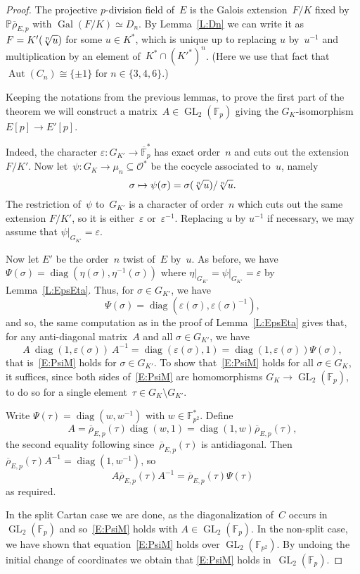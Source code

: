 \documentclass[twoside,leqno,symbols-for-thanks, draft]{rmi}
\numberwithin{equation}{section}
\newcommand{\F}{\mathbb{F}}
\newcommand{\Fp}{\mathbb{F}_p}
\newcommand{\PP}{\mathbb{P}}
\newcommand{\rhobar}{{\overline{\rho}}}
\newcommand{\eps}{\varepsilon}
\newcommand{\calO}{\mathcal{O}}
\DeclareMathOperator{\Aut}{Aut}
\DeclareMathOperator{\Gal}{Gal}
\newcommand{\GL}{\operatorname{GL}}
\newcommand{\diag}{{\operatorname{diag}}}
\theoremstyle{remark}
\begin{document}
\begin{proof} 
The projective $p$-division field of~$E$ is the Galois extension~$F/K$
fixed by $\PP \rhobar_{E,p}$ with $\Gal(F/K) \simeq D_n$. By
Lemma~\ref{L:Dn} we can write it as $F=K'(\root n\of u)$ for some
$u\in K^*$, which is unique up to replacing $u$ by~$u^{-1}$ and
multiplication by an element of~$K^*\cap(K'^*)^n$.  (Here we use that
fact that~$\Aut(C_n)\cong\{\pm1\}$ for $n\in\{3,4,6\}$.)

Keeping the notations from the previous lemmas, to prove the first
part of the theorem we will construct a matrix~$A\in\GL_2(\Fp)$
giving the $G_K$-isomorphism $E[p]\to E'[p]$.

Indeed, the character $\eps:G_{K'} \to
\overline{\F}_p^*$ has exact order~$n$ and cuts out the extension
$F/K'$.
Now let~$\psi:G_K\to \mu_n\subseteq\calO^*$ be the cocycle associated
to~$u$, namely
\[
\sigma\mapsto \psi(\sigma) = \sigma(\root n\of u)/\root n\of u.
\]
The restriction of~$\psi$ to~$G_{K'}$ is a character of order~$n$
which cuts out the same extension $F/K'$, so it is either~$\eps$ or~$\eps^{-1}$.  Replacing $u$ by $u^{-1}$ if necessary, we may assume that
$\left.\psi\right|_{G_{K'}} = \eps$.

Now let $E'$ be the order~$n$ twist of~$E$ by~$u$.  As before, we have
$\Psi(\sigma)=\diag(\eta(\sigma),\eta^{-1}(\sigma))$ where
$\left.\eta\right|_{G_{K'}} = \left.\psi\right|_{G_{K'}} = \eps$ by Lemma~\ref{L:EpsEta}.
Thus, for $\sigma\in G_{K'}$, we have
\[
\Psi(\sigma) = \diag(\eps(\sigma),\eps(\sigma)^{-1}),
\]
and so, the same computation as in the proof of Lemma~\ref{L:EpsEta} 
gives that, for any anti-diagonal matrix~$A$
and all $\sigma\in G_{K'}$, we have
\[
A\ \diag(1,\eps(\sigma))\ A^{-1} = \diag(\eps(\sigma),1) =
\diag(1,\eps(\sigma)) \Psi(\sigma),
\]
that is~\eqref{E:PsiM} holds for $\sigma\in G_{K'}$.  To show
that~\eqref{E:PsiM} holds for all $\sigma\in G_{K}$, it suffices,
since both sides of~\eqref{E:PsiM} are homomorphisms $G_K\to
\GL_2(\Fp)$, to do so for a single element~$\tau\in G_K\setminus
G_{K'}$.

Write $\Psi(\tau)=\diag(w,w^{-1})$ with $w\in\F_{p^2}^*$.  Define
\[
A=\rhobar_{E,p}(\tau)\diag(w,1)=\diag(1,w)\rhobar_{E,p}(\tau),
\]
the second equality following since~$\rhobar_{E,p}(\tau)$ is
antidiagonal.  Then $\rhobar_{E,p}(\tau)A^{-1}=\diag(1,w^{-1})$, so
\[
A \rhobar_{E,p}(\tau) A^{-1} = \rhobar_{E,p}(\tau)\Psi(\tau)
\]
as required.

In the split Cartan case we are done, as the diagonalization
of~$C$ occurs in~$\GL_2(\Fp)$ and so~\eqref{E:PsiM} holds with $A \in
\GL_2(\F_{p})$.  In the non-split case, we have shown that
equation~\eqref{E:PsiM} holds over $\GL_2(\F_{p^2})$. By undoing the
initial change of coordinates we obtain that \eqref{E:PsiM} holds
in~$\GL_2(\Fp)$.


\end{proof}
\end{document}
